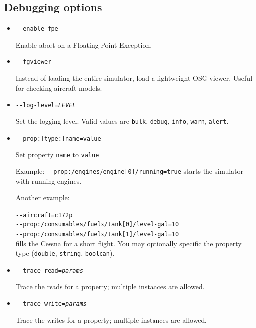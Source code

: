 \subsection{Debugging options}
\begin{itemize}

\item{\texttt{-$ $-enable-fpe}}

Enable abort on a Floating Point Exception. 

\item{\texttt{-$ $-fgviewer}}

Instead of loading the entire simulator, load a lightweight OSG viewer. Useful for checking aircraft
models.

\item{\texttt{-$ $-log-level={\it LEVEL}}}

Set the logging level. Valid values are \texttt{bulk}, \texttt{debug}, \texttt{info}, \texttt{warn}, \texttt{alert}.

\item{\texttt{-$ $-prop:[type:]name=value}}

Set property \texttt{name} to \texttt{value}

Example: \texttt{-$ $-prop:/engines/engine[0]/running=true} starts the simulator with running engines.

Another example:

\texttt{-$ $-aircraft=c172p}\\
\texttt{-$ $-prop:/consumables/fuels/tank[0]/level-gal=10}\\
\texttt{-$ $-prop:/consumables/fuels/tank[1]/level-gal=10}\\

fills the Cessna for a short flight. You may optionally specific
the property type (\texttt{double}, \texttt{string}, \texttt{boolean}).

\item{\texttt{-$ $-trace-read={\it params}}}

Trace the reads for a property; multiple instances are allowed.

\item{\texttt{-$ $-trace-write={\it params}}}

Trace the writes for a property; multiple instances are allowed.
\end{itemize}




